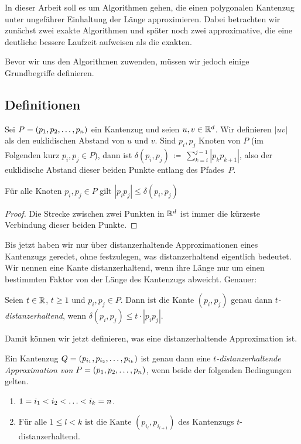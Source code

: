     In dieser Arbeit soll es um Algorithmen gehen, die einen polygonalen Kantenzug unter ungefährer Einhaltung der Länge approximieren. 
    Dabei betrachten wir zunächst zwei exakte Algorithmen und später noch zwei approximative, die eine deutliche bessere Laufzeit aufweisen als die exakten. 
    
    Bevor wir uns den Algorithmen zuwenden, müssen wir jedoch einige Grundbegriffe definieren.
   
   \subsection{Definitionen}
   \label{subsec:def}
	Sei $P = (p_1, p_2, \mathellipsis, p_n)$ ein Kantenzug und seien $u, v \in \mathbb{R}^d$. 
	Wir definieren $|uv|$ als den euklidischen Abstand von $u$ und $v$.
    Sind $p_i, p_j$ Knoten von $P$ (im Folgenden kurz $p_i, p_j \in P$), dann ist $\delta(p_i, p_j)~\coloneqq~\sum\limits_{k=i}^{j-1}{|p_k
    p_{k+1}|}$, also der euklidische Abstand dieser beiden Punkte entlang des Pfades~$P$.
	\begin{lemma}
		\label{lem:triangle}
		Für alle Knoten $p_i, p_j \in P$ gilt $|p_ip_j| \leq \delta(p_i, p_j)$
	\end{lemma}
	\begin{proof}
		Die Strecke zwischen zwei Punkten in $\mathbb{R}^d$ ist immer die kürzeste Verbindung dieser beiden Punkte.
	\end{proof}
	Bis jetzt haben wir nur über distanzerhaltende Approximationen eines Kantenzugs geredet, ohne  festzulegen, was distanzerhaltend eigentlich bedeutet. 
	Wir nennen eine Kante distanzerhaltend, wenn ihre Länge nur um einen bestimmten Faktor von der Länge des Kantenzugs abweicht. Genauer:
	\begin{definition}[$t$-distanzerhaltend]
		\label{def:t-dist}
		Seien $t \in \mathbb{R}$, $t \geq 1$ und $p_i, p_j \in P$. Dann ist die Kante $(p_i, p_j)$ genau dann \emph{$t$-distanzerhaltend}, wenn $\delta(p_i, p_j) \leq t \cdot |p_ip_j|$.
	\end{definition}
	
	Damit können wir jetzt definieren, was eine distanzerhaltende Approximation ist.

	\begin{definition}
		\label{def:t-distapp}
		Ein Kantenzug $Q = (p_{i_1}, p_{i_2}, \mathellipsis, p_{i_k})$ ist genau dann eine \emph{$t$-distanzerhaltende Approximation von $P = (p_1, p_2, \mathellipsis, p_n)$}, wenn beide der folgenden Bedingungen gelten.
		\begin{enumerate}
			\item $\displaystyle 1 = i_1 < i_2 < \mathellipsis < i_k = n$.
			\item $\displaystyle \text{Für alle } 1 \leq l < k \text{ ist die Kante } (p_{i_l}, p_{i_{l+1}})$ des Kantenzugs $t$-distanzerhaltend.
		\end{enumerate}
	\end{definition}
	
